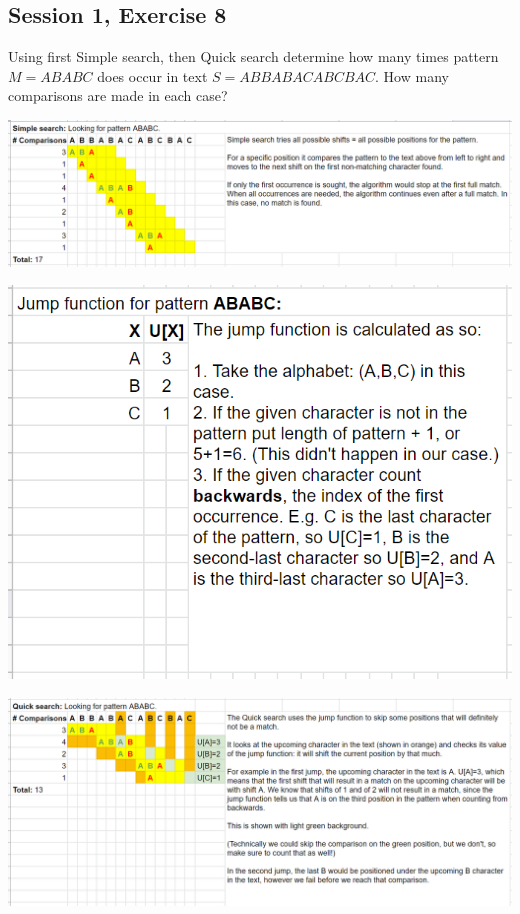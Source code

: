 \subsection{Session 1, Exercise 8}


Using first Simple search, then Quick search determine how many times pattern $M = ABABC$ does occur in text $S = ABBABACABCBAC$. How many comparisons are made in each case?



\includegraphics[width=\linewidth]{01/simple_search.png}

\includegraphics[width=0.5\linewidth]{01/jump_function.png}

\includegraphics[width=\linewidth]{01/quick_search.png}